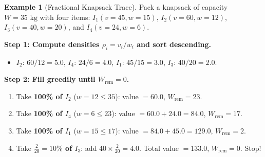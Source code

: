 \documentclass[11pt,a4paper]{article}
\theoremstyle{definition}
\newtheorem{example}{Example}[section]
\begin{document}
\begin{example}[Fractional Knapsack Trace]
Pack a knapsack of capacity $W = 35\text{ kg}$ with four items:
$I_1(v{=}45, w{=}15)$, $I_2(v{=}60, w{=}12)$, $I_3(v{=}40, w{=}20)$, and $I_4(v{=}24, w{=}6)$.

\textbf{Step 1: Compute densities $\rho_i = v_i / w_i$ and sort descending.}
\begin{itemize}[itemsep=1pt, topsep=2pt]
    \item $I_2$: $60 / 12 = 5.0$, \quad $I_4$: $24 / 6 = 4.0$, \quad $I_1$: $45 / 15 = 3.0$, \quad $I_3$: $40 / 20 = 2.0$.
\end{itemize}

\textbf{Step 2: Fill greedily until $W_{\text{rem}} = 0$.}
\begin{enumerate}[itemsep=2pt, topsep=2pt]
    \item Take \textbf{100\% of $I_2$} ($w = 12 \le 35$): value $= 60.0$, $W_{\text{rem}} = 23$.
    \item Take \textbf{100\% of $I_4$} ($w = 6 \le 23$): value $= 60.0 + 24.0 = 84.0$, $W_{\text{rem}} = 17$.
    \item Take \textbf{100\% of $I_1$} ($w = 15 \le 17$): value $= 84.0 + 45.0 = 129.0$, $W_{\text{rem}} = 2$.
    \item Take \textbf{$\tfrac{2}{20} = 10\%$ of $I_3$}: add $40 \times \tfrac{2}{20} = 4.0$. Total value $= \mathbf{133.0}$, $W_{\text{rem}} = 0$. Stop!
\end{enumerate}
\end{example}
\end{document}

